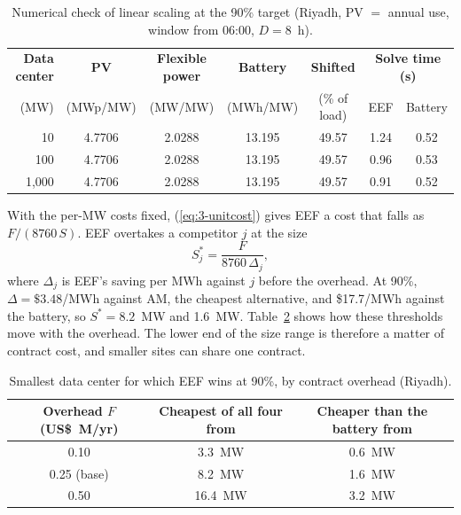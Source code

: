 \begin{table}[!htbp]
\centering
\caption{Numerical check of linear scaling at the 90\% target (Riyadh, PV $=$ annual use, window from 06:00, $D=8$~h).}
\label{tab:3-scaling}
\small
\begin{tabular}{@{}rcccccc@{}}
\toprule
\textbf{Data center} & \textbf{PV} & \textbf{Flexible power} & \textbf{Battery} & \textbf{Shifted} & \multicolumn{2}{c}{\textbf{Solve time (s)}} \\
(MW) & (MWp/MW) & (MW/MW) & (MWh/MW) & (\% of load) & EEF & Battery \\
\midrule
10 & 4.7706 & 2.0288 & 13.195 & 49.57 & 1.24 & 0.52 \\
100 & 4.7706 & 2.0288 & 13.195 & 49.57 & 0.96 & 0.53 \\
1,000 & 4.7706 & 2.0288 & 13.195 & 49.57 & 0.91 & 0.52 \\
\bottomrule
\end{tabular}
\end{table}

With the per-MW costs fixed, (\ref{eq:3-unitcost}) gives EEF a cost that falls as $F/(8760\,S)$. EEF overtakes a competitor $j$ at the size
\begin{equation}
S^\ast_j=\frac{F}{8760\,\Delta_j},
\label{eq:3-threshold}
\end{equation}
where $\Delta_j$ is EEF's saving per MWh against $j$ before the overhead. At 90\%, $\Delta=\$3.48$/MWh against AM, the cheapest alternative, and \$17.7/MWh against the battery, so $S^\ast=8.2$~MW and 1.6~MW. Table~\ref{tab:3-overhead} shows how these thresholds move with the overhead. The lower end of the size range is therefore a matter of contract cost, and smaller sites can share one contract.

\begin{table}[!htbp]
\centering
\caption{Smallest data center for which EEF wins at 90\%, by contract overhead (Riyadh).}
\label{tab:3-overhead}
\small
\begin{tabular}{@{}ccc@{}}
\toprule
\textbf{Overhead $F$ (US\$~M/yr)} & \textbf{Cheapest of all four from} & \textbf{Cheaper than the battery from} \\
\midrule
0.10 & 3.3~MW & 0.6~MW \\
0.25 (base) & 8.2~MW & 1.6~MW \\
0.50 & 16.4~MW & 3.2~MW \\
\bottomrule
\end{tabular}
\end{table}

